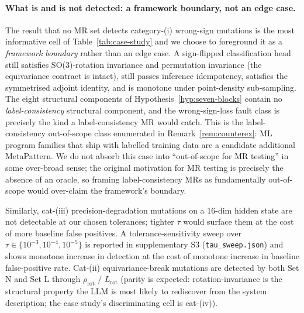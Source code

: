 \documentclass[acmsmall,screen,review]{acmart}
\begin{document}
\paragraph{What is and is not detected: a framework boundary, not an edge case.}
The result that no MR set detects category-(i) wrong-sign mutations is the most informative cell of Table~\ref{tab:case-study} and we choose to foreground it as a \emph{framework boundary} rather than an edge case. A sign-flipped classification head still satisfies SO(3)-rotation invariance and permutation invariance (the equivariance contract is intact), still passes inference idempotency, satisfies the symmetrised adjoint identity, and is monotone under point-density sub-sampling. The eight structural components of Hypothesis~\ref{hyp:seven-blocks} contain no \emph{label-consistency} structural component, and the wrong-sign-loss fault class is precisely the kind a label-consistency MR would catch. This is the label-consistency out-of-scope class enumerated in Remark~\ref{rem:counterex}: ML program families that ship with labelled training data are a candidate additional MetaPattern. We do not absorb this case into ``out-of-scope for MR testing'' in some over-broad sense; the original motivation for MR testing is precisely the absence of an oracle, so framing label-consistency MRs as fundamentally out-of-scope would over-claim the framework's boundary.

Similarly, cat-(iii) precision-degradation mutations on a 16-dim hidden state are not detectable at our chosen tolerances; tighter $\tau$ would surface them at the cost of more baseline false positives. A tolerance-sensitivity sweep over $\tau \in \{10^{-3}, 10^{-4}, 10^{-5}\}$ is reported in supplementary S3 (\texttt{tau\_sweep.json}) and shows monotone increase in detection at the cost of monotone increase in baseline false-positive rate. Cat-(ii) equivariance-break mutations are detected by both Set N and Set L through $\rho_{\mathrm{rot}}$ / $L_{\mathrm{rot}}$ (parity is expected: rotation-invariance is the structural property the LLM is most likely to rediscover from the system description; the case study's discriminating cell is cat-(iv)).
\end{document}
